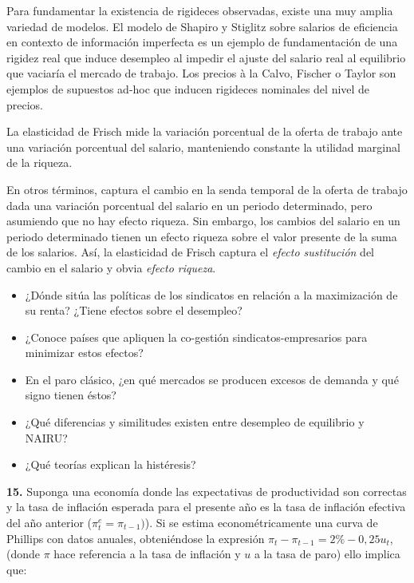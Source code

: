 \documentclass{nuevotema}
\begin{document}
Para fundamentar la existencia de rigideces observadas, existe una muy amplia variedad de modelos. El modelo de Shapiro y Stiglitz sobre salarios de eficiencia en contexto de información imperfecta es un ejemplo de fundamentación de una rigidez real que induce desempleo al impedir el ajuste del salario real al equilibrio que vaciaría el mercado de trabajo. Los precios à la Calvo, Fischer o Taylor son ejemplos de supuestos ad-hoc que inducen rigideces nominales del nivel de precios. 



La elasticidad de Frisch mide la variación porcentual de la oferta de trabajo ante una variación porcentual del salario, manteniendo constante la utilidad marginal de la riqueza.

En otros términos, captura el cambio en la senda temporal de la oferta de trabajo dada una variación porcentual del salario en un periodo determinado, pero asumiendo que no hay efecto riqueza. Sin embargo, los cambios del salario en un periodo determinado tienen un efecto riqueza sobre el valor presente de la suma de los salarios. Así, la elasticidad de Frisch captura el \textit{efecto sustitución} del cambio en el salario y obvia \textit{efecto riqueza}.

\preguntas


\begin{itemize}
	\item ¿Dónde sitúa las políticas de los sindicatos en relación a la maximización de su renta? ¿Tiene efectos sobre el desempleo?
	\item ¿Conoce países que apliquen la co-gestión sindicatos-empresarios para minimizar estos efectos?
	\item En el paro clásico, ¿en qué mercados se producen excesos de demanda y qué signo tienen éstos?
	\item ¿Qué diferencias y similitudes existen entre desempleo de equilibrio y NAIRU?
	\item ¿Qué teorías explican la histéresis?
\end{itemize}


\textbf{15.} Suponga una economía donde las expectativas de productividad son correctas y la tasa de inflación esperada para el presente año es la tasa de inflación efectiva del año anterior ($\pi^e_t = \pi_{t-1})$). Si se estima econométricamente una curva de Phillips con datos anuales, obteniéndose la expresión $\pi_t - \pi_{t-1} = 2\% - 0,25u_t$, (donde $\pi$ hace referencia a la tasa de inflación y $u$ a la tasa de paro) ello implica que:
\end{document}
